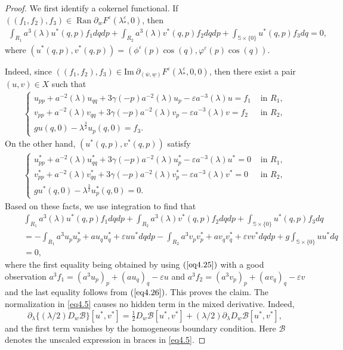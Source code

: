 \documentclass[11pt,reqno]{amsart}
\numberwithin{equation}{section}
\theoremstyle{definition}
\theoremstyle{remark}
\begin{document}
\begin{proof}
We first identify a cokernel functional.  If
$((f_1,f_2),f_3)\in
\operatorname{Ran}\partial_wF^{\varepsilon}
(\lambda_*^{\varepsilon},0)$, then
\begin{eqnarray} \label{eq4.24}
\int_{R_1}a^3(\lambda)u^*(q,p)f_1
dqdp+\int_{R_2}a^3(\lambda)v^*(q,p)f_2
dqdp+\int_{\mathbb{S}\times\{0\}}u^*(q,p) f_3 dq=0,
\end{eqnarray}
where
$(u^*(q,p),v^*(q,p))=(\phi^{\varepsilon}(p)\cos(q),\varphi^{\varepsilon}(p)\cos(q))$.

Indeed, since  $((f_1,f_2),f_3)\in \text{Im}~
\partial_{(\overline{w},\underline{w})}F^{\varepsilon}(\lambda_*^{\varepsilon},
0, 0)$, then there exist a pair $(u,v)\in X$ such that
\begin{eqnarray}
\left\{\begin{array}{llll}
{u_{pp}+a^{-2}(\lambda)u_{qq}+3\gamma(-p)a^{-2}(\lambda)u_p-\varepsilon a^{-3}(\lambda)u=f_1} & {\text { in } R_1}, \\
{v_{pp}+a^{-2}(\lambda)v_{qq}+3\gamma(-p)a^{-2}(\lambda)v_p-\varepsilon a^{-3}(\lambda) v=f_2} & { \text { in } R_2}, \\
{gu(q,0)-\lambda^{\frac{3}{2}}u_p(q,0)=f_3}.\end{array}\right.
\label{eq4.25}
\end{eqnarray}
On the other hand, $(u^*(q,p),v^*(q,p))$ satisfy
\begin{eqnarray}
\left\{\begin{array}{llll}
{u^*_{pp}+a^{-2}(\lambda)u^*_{qq}+3\gamma(-p)a^{-2}(\lambda)u^*_p-\varepsilon a^{-3}(\lambda)u^*=0} & {\text { in } R_1}, \\
{v^*_{pp}+a^{-2}(\lambda)v^*_{qq}+3\gamma(-p)a^{-2}(\lambda)v^*_p-\varepsilon a^{-3}(\lambda)v^*=0} & { \text { in } R_2}, \\
{gu^*(q,0)-\lambda^{\frac{3}{2}}u^*_p(q,0)=0}.\end{array}\right.
\label{eq4.26}
\end{eqnarray}
Based on these facts, we use integration to find that
\begin{eqnarray}
&~& \int_{R_1}a^3(\lambda)u^*(q,p)f_1 dqdp+\int_{R_2}a^3(\lambda)v^*(q,p)f_2 dqdp+\int_{\mathbb{S}\times\{0\}}u^*(q,p) f_3 dq\nonumber\\
&~&= -\int_{R_1}a^3u_pu^*_p+au_qu^*_q +\varepsilon uu^* dqdp-\int_{R_2}a^3v_pv^*_p+av_qv^*_q+\varepsilon vv^* dqdp+g\int_{\mathbb{S}\times\{0\}}uu^* dq\nonumber\\
&~&=0, \nonumber
\end{eqnarray}
where the first equality being obtained by using $(\ref{eq4.25})$
with a good observation
$a^3f_1=\left(a^3u_p\right)_p+\left(au_q\right)_q-\varepsilon u$ and
$a^3f_2=\left(a^3v_p\right)_p+\left(av_q\right)_q-\varepsilon v$ and
the last equality follows from $(\ref{eq4.26})$. This proves the
claim.  The normalization in \eqref{eq4.5} causes no hidden term in
the mixed derivative.  Indeed,
\[
 \partial_\lambda\{(\lambda/2)D_w\mathcal B\}[u^*,v^*]
 =\tfrac12D_w\mathcal B[u^*,v^*]
  +(\lambda/2)\partial_\lambda D_w\mathcal B[u^*,v^*],
\]
and the first term vanishes by the homogeneous boundary condition.
Here $\mathcal B$ denotes the unscaled expression in braces in
\eqref{eq4.5}.


\end{proof}
\end{document}
